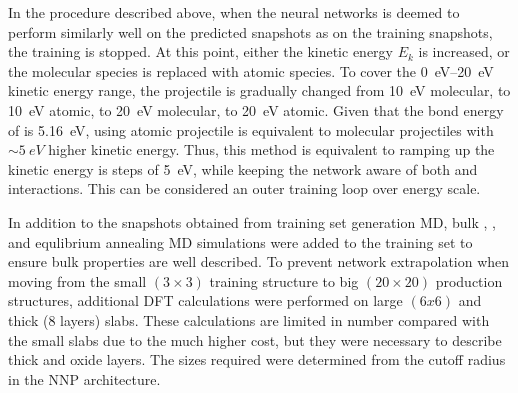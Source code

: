 \documentclass[manuscript=cmatex]{achemso}
\begin{document}
In the procedure described above, when the neural networks is deemed to perform similarly well on the predicted snapshots as on the training snapshots, the training is stopped. At this point, either the kinetic energy $E_k$ is increased, or the molecular species is replaced with atomic species. To cover the \SIrange{0}{20}{eV} kinetic energy range, the projectile is gradually changed from \SI{10}{eV} molecular, to \SI{10}{eV} atomic, to \SI{20}{eV} molecular, to \SI{20}{eV} atomic. Given that the bond energy of  is \SI{5.16}{eV}, using atomic projectile is equivalent to molecular projectiles with $\sim\SI{5}{eV}$ higher kinetic energy. Thus, this method is equivalent to ramping up the kinetic energy is steps of \SI{5}{eV}, while keeping the network aware of both  and  interactions. This can be considered an outer training loop over energy scale.

In addition to the snapshots obtained from training set generation MD, bulk , , and  equlibrium annealing MD simulations were added to the training set to ensure bulk properties are well described. To prevent network extrapolation when moving from the small $(3\times3)$ training structure to big $(20\times 20)$ production structures, additional DFT calculations were performed on large $(6x6)$ and thick (8 layers) slabs. These calculations are limited in number compared with the small slabs due to the much higher cost, but they were necessary to describe thick  and oxide layers. The sizes required were determined from the cutoff radius in the NNP architecture. 
\end{document}
